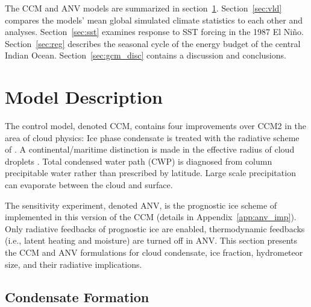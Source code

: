 \documentclass[agums]{aguplus}
\begin{document}

The CCM and ANV models are summarized in section~\ref{sec:gcm_model}. 
Section~\ref{sec:vld} compares the models' mean global simulated
climate statistics to each other and analyses.
Section~\ref{sec:sst} examines response to SST forcing in the 1987 El
Ni\~no. 
Section~\ref{sec:reg} describes the seasonal cycle of the energy
budget of the central Indian Ocean.
Section~\ref{sec:gcm_disc} contains a discussion and conclusions.

\section{Model Description}\label{sec:gcm_model}

The control model, denoted CCM, contains four improvements over CCM2
\cite[]{HBB93} in the area of cloud physics:   
Ice phase condensate is treated with the radiative scheme of
\cite{EbC92}.
A continental/maritime distinction is made in the effective radius of
cloud droplets \cite[]{Kie942}.
Total condensed water path (CWP) is diagnosed from column precipitable
water rather than prescribed by latitude. 
Large scale precipitation can evaporate between the cloud and surface.

The sensitivity experiment, denoted ANV, is the prognostic ice scheme
of \cite{ZeK961} implemented in this version of the CCM (details in
Appendix~\ref{app:anv_imp}).  
Only radiative feedbacks of prognostic ice are enabled, thermodynamic
feedbacks (i.e., latent heating and moisture) are turned off in ANV.
This section presents the CCM and ANV formulations for cloud
condensate, ice fraction, hydrometeor size, and their radiative
implications.

\subsection{Condensate Formation}\label{sec:qc}
\end{document}

